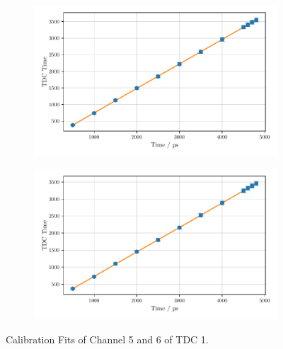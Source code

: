 \begin{figure}
    \centering
    \begin{subfigure}[b]{0.48\textwidth}
        \includegraphics[width=\textwidth]{plots/tdc4.pdf}
    \end{subfigure}\hfill
    \begin{subfigure}[b]{0.48\textwidth}
        \includegraphics[width=\textwidth]{plots/tdc5.pdf}
    \end{subfigure}
    \caption{Calibration Fits of Channel 5 and 6 of TDC 1.}
    \label{fig:tdc45}
\end{figure}
